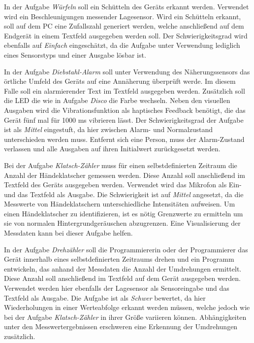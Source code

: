 \documentclass[11pt,a4paper]{report}
\begin{document}
In der Aufgabe \textit{Würfeln} soll ein Schütteln des Geräts erkannt werden.
Verwendet wird ein Beschleunigungen messender Lagesensor.
Wird ein Schütteln erkannt, soll auf dem PC eine Zufallszahl generiert werden, welche anschließend auf dem Endgerät in einem Textfeld ausgegeben werden soll.
Der Schwierigkeitsgrad wird ebenfalls auf \textit{Einfach} eingeschätzt, da die Aufgabe unter Verwendung lediglich eines Sensorstyps und einer Ausgabe lösbar ist.

In der Aufgabe \textit{Diebstahl-Alarm} soll unter Verwendung des Näherungssensors das örtliche Umfeld des Geräts auf eine Annäherung überprüft werde.
Im diesem Falle soll ein alarmierender Text im Textfeld ausgegeben werden.
Zusätzlich soll die LED die wie in Aufgabe \textit{Disco} die Farbe wechseln.
Neben den visuellen Ausgaben wird die Vibrationsfunktion als haptisches Feedback benötigt, die das Gerät fünf mal für 1000 ms vibrieren lässt.
Der Schwierigkeitsgrad der Aufgabe ist als \textit{Mittel} eingestuft, da hier zwischen Alarm- und Normalzustand unterschieden werden muss.
Entfernt sich eine Person, muss der Alarm-Zustand verlassen und alle Ausgaben auf ihren Initialwert zurückgesetzt werden.

Bei der Aufgabe \textit{Klatsch-Zähler} muss für einen selbstdefinierten Zeitraum die Anzahl der Händeklatscher gemessen werden.
Diese Anzahl soll anschließend im Textfeld des Geräts ausgegeben werden.
Verwendet wird das Mikrofon als Ein- und das Textfeld als Ausgabe.
Die Schwierigkeit ist auf \textit{Mittel} angesetzt, da die Messwerte von Händeklatschern unterschiedliche Intensitäten aufweisen.
Um einen Händeklatscher zu identifizieren, ist es nötig Grenzwerte zu ermitteln um sie von normalen Hintergrundgeräuschen abzugrenzen.
Eine Visualisierung der Messdaten kann bei dieser Aufgabe helfen.

In  der Aufgabe \textit{Drehzähler} soll die Programmiererin oder der Programmierer das Gerät innerhalb eines selbstdefinierten Zeitraums drehen und ein Programm entwickeln, das anhand der Messdaten die Anzahl der Umdrehungen ermittelt.
Diese Anzahl soll anschließend im Textfeld auf dem Gerät ausgegeben werden.
Verwendet werden hier ebenfalls der Lagesensor als Sensoreingabe und das Textfeld als Ausgabe.
Die Aufgabe ist als \textit{Schwer} bewertet, da hier Wiederholungen in einer Werteabfolge erkannt werden müssen, welche jedoch wie bei der Aufgabe \textit{Klatsch-Zähler} in ihrer Größe variieren können.
Abhängigkeiten unter den Messwertergebnissen erschweren eine Erkennung der Umdrehungen zusätzlich.
\end{document}
